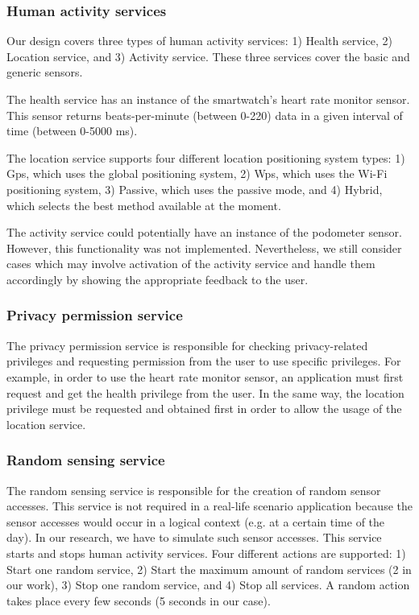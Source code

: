 \documentclass[conference, a4paper, 10pt, twocolumn]{IEEEtran}
\begin{document}
\subsubsection{\textbf{Human activity services}}
Our design covers three types of human activity services: 1) Health service, 2) Location service, and 3) Activity service. These three services cover the basic and generic sensors.

The health service has an instance of the smartwatch's heart rate monitor sensor. This sensor returns beats-per-minute (between 0-220) data in a given interval of time (between 0-5000 ms).

The location service supports four different location positioning system types: 1) Gps, which uses the global positioning system, 2) Wps, which uses the Wi-Fi positioning system, 3) Passive, which uses the passive mode, and 4) Hybrid, which selects the best method available at the moment. 

The activity service could potentially have an instance of the podometer sensor. However, this functionality was not implemented. Nevertheless, we still consider cases which may involve activation of the activity service and handle them accordingly by showing the appropriate feedback to the user. 

\subsubsection{\textbf{Privacy permission service}}
The privacy permission service is responsible for checking privacy-related privileges and requesting permission from the user to use specific privileges. For example, in order to use the heart rate monitor sensor, an application must first request and get the health privilege from the user. In the same way, the location privilege must be requested and obtained first in order to allow the usage of the location service.

\subsubsection{\textbf{Random sensing service}}
The random sensing service is responsible for the creation of random sensor accesses. This service is not required in a real-life scenario application because the sensor accesses would occur in a logical context (e.g. at a certain time of the day). In our research, we have to simulate such sensor accesses. This service starts and stops human activity services. Four different actions are supported: 1) Start one random service, 2) Start the maximum amount of random services (2 in our work), 3) Stop one random service, and 4) Stop all services. A random action takes place every few seconds (5 seconds in our case).
\end{document}
